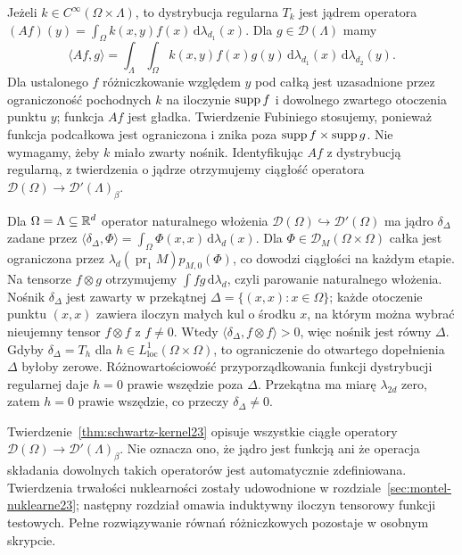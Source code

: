 \begin{przyklad}
\label{ex:smooth-kernel23}
Jeżeli $k\in C^\infty(\Omega\times\Lambda)$, to dystrybucja
regularna $T_k$ jest jądrem operatora
$(Af)(y)=\int_\Omega k(x,y)f(x)\,\mathrm d\lambda_{d_1}(x)$.
Dla $g\in\mathcal D(\Lambda)$ mamy
\[
\langle Af,g\rangle
=\int_{\Lambda}\int_{\Omega}k(x,y)f(x)g(y)
\,\mathrm d\lambda_{d_1}(x)\,\mathrm d\lambda_{d_2}(y).
\]
Dla ustalonego $f$ różniczkowanie względem $y$
pod całką jest uzasadnione przez ograniczoność pochodnych
$k$ na iloczynie $\operatorname{supp} f$ i dowolnego zwartego
otoczenia punktu $y$; funkcja $Af$ jest gładka.
Twierdzenie Fubiniego stosujemy, ponieważ funkcja
podcałkowa jest ograniczona i znika poza
$\operatorname{supp} f\times\operatorname{supp} g$. Nie wymagamy, żeby $k$
miało zwarty nośnik. Identyfikując $Af$ z dystrybucją
regularną, z twierdzenia o jądrze otrzymujemy
ciągłość operatora $\mathcal D(\Omega)\to
\mathcal D'(\Lambda)_\beta$.
\end{przyklad}

\begin{przyklad}
\label{ex:diagonal-kernel23}
Dla $\Omega=\Lambda\subseteq\mathbb R^d$ operator naturalnego
włożenia $\mathcal D(\Omega)\hookrightarrow\mathcal D'(\Omega)$
ma jądro $\delta_\Delta$ zadane przez
$\langle\delta_\Delta,\Phi\rangle
=\int_\Omega\Phi(x,x)\,\mathrm d\lambda_d(x)$.
Dla $\Phi\in\mathcal D_M(\Omega\times\Omega)$
całka jest ograniczona przez
$\lambda_d(\operatorname{pr}_1 M)p_{M,0}(\Phi)$,
co dowodzi ciągłości na każdym etapie.
Na tensorze $f\otimes g$ otrzymujemy $\int fg\,
\mathrm d\lambda_d$, czyli parowanie naturalnego
włożenia. Nośnik $\delta_\Delta$ jest zawarty
w przekątnej $\Delta=\{(x,x):x\in\Omega\}$;
każde otoczenie punktu $(x,x)$ zawiera iloczyn
małych kul o środku $x$, na którym można wybrać
nieujemny tensor $f\otimes f$ z $f\ne0$.
Wtedy $\langle\delta_\Delta,f\otimes f\rangle>0$,
więc nośnik jest równy $\Delta$.
Gdyby $\delta_\Delta=T_h$ dla
$h\in L^1_{\mathrm{loc}}(\Omega\times\Omega)$,
to ograniczenie do otwartego dopełnienia $\Delta$
byłoby zerowe. Różnowartościowość przyporządkowania
funkcji dystrybucji regularnej daje $h=0$ prawie
wszędzie poza $\Delta$. Przekątna ma miarę
$\lambda_{2d}$ zero, zatem $h=0$ prawie wszędzie,
co przeczy $\delta_\Delta\ne0$.
\end{przyklad}

\begin{uwaga}
\label{rem:kernel-scope23}
Twierdzenie~\ref{thm:schwartz-kernel23} opisuje wszystkie
ciągłe operatory $\mathcal D(\Omega)\to\mathcal D'(\Lambda)_\beta$.
Nie oznacza ono, że jądro jest funkcją ani że operacja
składania dowolnych takich operatorów jest automatycznie
zdefiniowana. Twierdzenia trwałości nuklearności zostały udowodnione
w rozdziale~\ref{sec:montel-nuklearne23}; następny rozdział omawia
induktywny iloczyn tensorowy funkcji testowych. Pełne rozwiązywanie równań
różniczkowych pozostaje w osobnym skrypcie.
\end{uwaga}
